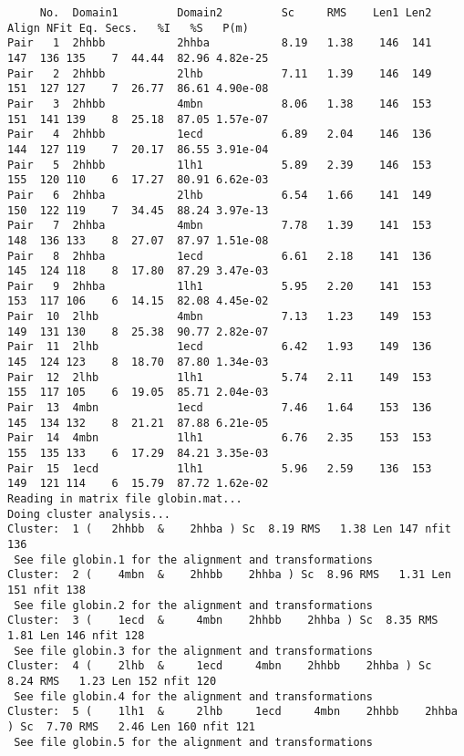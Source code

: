 \begin{scriptsize}
\begin{verbatim}
     No.  Domain1         Domain2         Sc     RMS    Len1 Len2  Align NFit Eq. Secs.   %I   %S   P(m)
Pair   1  2hhbb           2hhba           8.19   1.38    146  141   147  136 135    7  44.44  82.96 4.82e-25 
Pair   2  2hhbb           2lhb            7.11   1.39    146  149   151  127 127    7  26.77  86.61 4.90e-08 
Pair   3  2hhbb           4mbn            8.06   1.38    146  153   151  141 139    8  25.18  87.05 1.57e-07 
Pair   4  2hhbb           1ecd            6.89   2.04    146  136   144  127 119    7  20.17  86.55 3.91e-04 
Pair   5  2hhbb           1lh1            5.89   2.39    146  153   155  120 110    6  17.27  80.91 6.62e-03 
Pair   6  2hhba           2lhb            6.54   1.66    141  149   150  122 119    7  34.45  88.24 3.97e-13 
Pair   7  2hhba           4mbn            7.78   1.39    141  153   148  136 133    8  27.07  87.97 1.51e-08 
Pair   8  2hhba           1ecd            6.61   2.18    141  136   145  124 118    8  17.80  87.29 3.47e-03 
Pair   9  2hhba           1lh1            5.95   2.20    141  153   153  117 106    6  14.15  82.08 4.45e-02 
Pair  10  2lhb            4mbn            7.13   1.23    149  153   149  131 130    8  25.38  90.77 2.82e-07 
Pair  11  2lhb            1ecd            6.42   1.93    149  136   145  124 123    8  18.70  87.80 1.34e-03 
Pair  12  2lhb            1lh1            5.74   2.11    149  153   155  117 105    6  19.05  85.71 2.04e-03 
Pair  13  4mbn            1ecd            7.46   1.64    153  136   145  134 132    8  21.21  87.88 6.21e-05 
Pair  14  4mbn            1lh1            6.76   2.35    153  153   155  135 133    6  17.29  84.21 3.35e-03 
Pair  15  1ecd            1lh1            5.96   2.59    136  153   149  121 114    6  15.79  87.72 1.62e-02 
Reading in matrix file globin.mat...
Doing cluster analysis...
Cluster:  1 (   2hhbb  &    2hhba ) Sc  8.19 RMS   1.38 Len 147 nfit 136 
 See file globin.1 for the alignment and transformations
Cluster:  2 (    4mbn  &    2hhbb    2hhba ) Sc  8.96 RMS   1.31 Len 151 nfit 138 
 See file globin.2 for the alignment and transformations
Cluster:  3 (    1ecd  &     4mbn    2hhbb    2hhba ) Sc  8.35 RMS   1.81 Len 146 nfit 128 
 See file globin.3 for the alignment and transformations
Cluster:  4 (    2lhb  &     1ecd     4mbn    2hhbb    2hhba ) Sc  8.24 RMS   1.23 Len 152 nfit 120 
 See file globin.4 for the alignment and transformations
Cluster:  5 (    1lh1  &     2lhb     1ecd     4mbn    2hhbb    2hhba ) Sc  7.70 RMS   2.46 Len 160 nfit 121 
 See file globin.5 for the alignment and transformations

\end{verbatim} \end{scriptsize}

